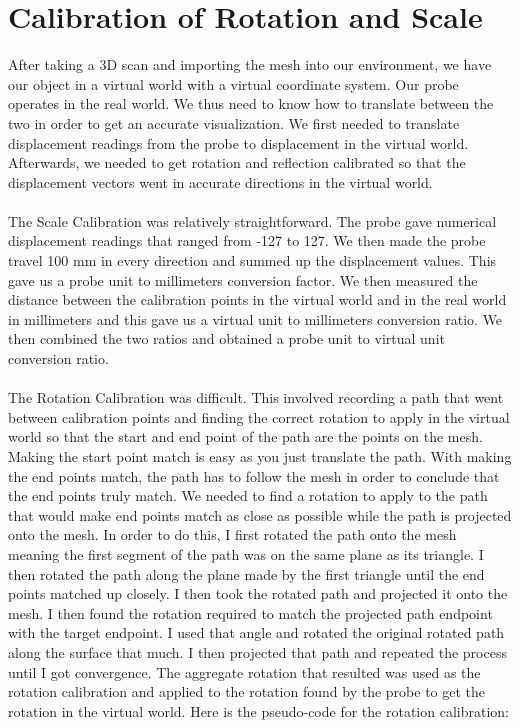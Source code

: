 \documentclass[11pt,psfig]{article}
\begin{document}
\section*{Calibration of Rotation and Scale}

After taking a 3D scan and importing the mesh into our environment, we have our object in a virtual world with a virtual coordinate system. Our probe operates in the real world. We thus need to know how to translate between the two in order to get an accurate visualization. We first needed to translate displacement readings from the probe to displacement in the virtual world. Afterwards, we needed to get rotation and reflection calibrated so that the displacement vectors went in accurate directions in the virtual world. \\
\\
The Scale Calibration was relatively straightforward. The probe gave numerical displacement readings that ranged from -127 to 127. We then made the probe travel 100 mm in every direction and summed up the displacement values. This gave us a probe unit to millimeters conversion factor. We then measured the distance between the calibration points in the virtual world and in the real world in millimeters and this gave us a virtual unit to millimeters conversion ratio. We then combined the two ratios and obtained a probe unit to virtual unit conversion ratio. \\
\\
The Rotation Calibration was difficult. This involved recording a path that went between calibration points and finding the correct rotation to apply in the virtual world so that the start and end point of the path are the points on the mesh. Making the start point match is easy as you just translate the path. With making the end points match, the path has to follow the mesh in order to conclude that the end points truly match. We needed to find a rotation to apply to the path that would make end points match as close as possible while the path is projected onto the mesh. In order to do this, I first rotated the path onto the mesh meaning the first segment of the path was on the same plane as its triangle. I then rotated the path along the plane made by the first triangle until the end points matched up closely. I then took the rotated path and projected it onto the mesh. I then found the rotation required to match the projected path endpoint with the target endpoint. I used that angle and rotated the original rotated path along the surface that much. I then projected that path and repeated the process until I got convergence. The aggregate rotation that resulted was used as the rotation calibration and applied to the rotation found by the probe to get the rotation in the virtual world. Here is the pseudo-code for the rotation calibration:
\end{document}
